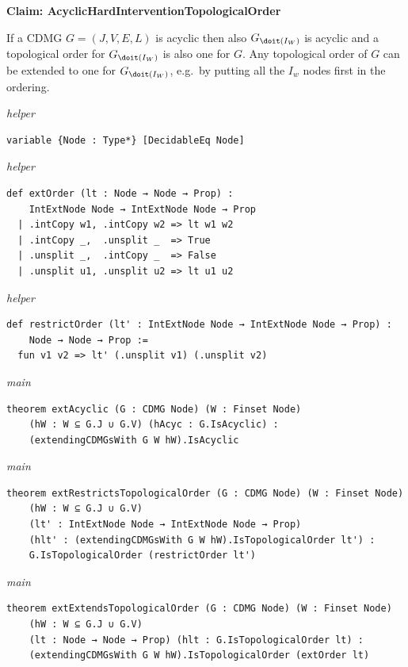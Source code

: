 \vspace{\appendixNotesGap}

\noindent\textbf{Claim: AcyclicHardInterventionTopologicalOrder}\par\smallskip
{\appendixTexSize
    If a CDMG $G=(J,V,E,L)$ is acyclic then also $G_{\doit(I_W)}$ is acyclic and a topological order for
    $G_{\doit(I_W)}$ is also one for $G$.
    Any topological order of $G$ can be extended to one for $G_{\doit(I_W)}$, e.g.\
    by putting all the $I_w$ nodes first in the ordering.
\par}
\smallskip
{\small\textit{helper}}
\begin{verbatim}
variable {Node : Type*} [DecidableEq Node]
\end{verbatim}
{\small\textit{helper}}
\begin{verbatim}
def extOrder (lt : Node → Node → Prop) :
    IntExtNode Node → IntExtNode Node → Prop
  | .intCopy w1, .intCopy w2 => lt w1 w2
  | .intCopy _,  .unsplit _  => True
  | .unsplit _,  .intCopy _  => False
  | .unsplit u1, .unsplit u2 => lt u1 u2
\end{verbatim}
{\small\textit{helper}}
\begin{verbatim}
def restrictOrder (lt' : IntExtNode Node → IntExtNode Node → Prop) :
    Node → Node → Prop :=
  fun v1 v2 => lt' (.unsplit v1) (.unsplit v2)
\end{verbatim}
{\small\textit{main}}
\begin{verbatim}
theorem extAcyclic (G : CDMG Node) (W : Finset Node)
    (hW : W ⊆ G.J ∪ G.V) (hAcyc : G.IsAcyclic) :
    (extendingCDMGsWith G W hW).IsAcyclic
\end{verbatim}
{\small\textit{main}}
\begin{verbatim}
theorem extRestrictsTopologicalOrder (G : CDMG Node) (W : Finset Node)
    (hW : W ⊆ G.J ∪ G.V)
    (lt' : IntExtNode Node → IntExtNode Node → Prop)
    (hlt' : (extendingCDMGsWith G W hW).IsTopologicalOrder lt') :
    G.IsTopologicalOrder (restrictOrder lt')
\end{verbatim}
{\small\textit{main}}
\begin{verbatim}
theorem extExtendsTopologicalOrder (G : CDMG Node) (W : Finset Node)
    (hW : W ⊆ G.J ∪ G.V)
    (lt : Node → Node → Prop) (hlt : G.IsTopologicalOrder lt) :
    (extendingCDMGsWith G W hW).IsTopologicalOrder (extOrder lt)
\end{verbatim}
~%


